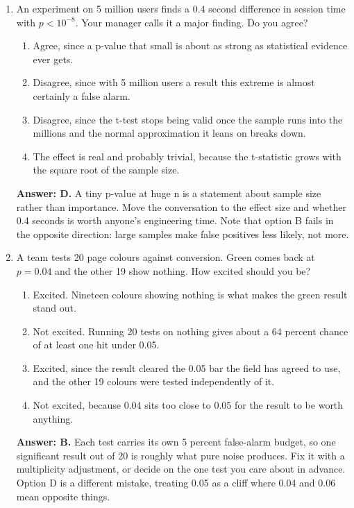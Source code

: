 \documentclass[11pt]{article}
\begin{document}
\begin{enumerate}[itemsep=14pt]
\item An experiment on 5 million users finds a 0.4 second difference in session time with $p < 10^{-8}$. Your manager calls it a major finding. Do you agree?

\begin{enumerate}[label=\Alph*., itemsep=1pt, topsep=3pt]
  \item Agree, since a p-value that small is about as strong as statistical evidence ever gets.
  \item Disagree, since with 5 million users a result this extreme is almost certainly a false alarm.
  \item Disagree, since the t-test stops being valid once the sample runs into the millions and the normal approximation it leans on breaks down.
  \item The effect is real and probably trivial, because the t-statistic grows with the square root of the sample size.
\end{enumerate}

\vspace{2pt}
\textbf{Answer: D.} A tiny p-value at huge n is a statement about sample size rather than importance. Move the conversation to the effect size and whether 0.4 seconds is worth anyone's engineering time. Note that option B fails in the opposite direction: large samples make false positives less likely, not more.
\vspace{4pt}

\item A team tests 20 page colours against conversion. Green comes back at $p = 0.04$ and the other 19 show nothing. How excited should you be?

\begin{enumerate}[label=\Alph*., itemsep=1pt, topsep=3pt]
  \item Excited. Nineteen colours showing nothing is what makes the green result stand out.
  \item Not excited. Running 20 tests on nothing gives about a 64 percent chance of at least one hit under 0.05.
  \item Excited, since the result cleared the 0.05 bar the field has agreed to use, and the other 19 colours were tested independently of it.
  \item Not excited, because 0.04 sits too close to 0.05 for the result to be worth anything.
\end{enumerate}

\vspace{2pt}
\textbf{Answer: B.} Each test carries its own 5 percent false-alarm budget, so one significant result out of 20 is roughly what pure noise produces. Fix it with a multiplicity adjustment, or decide on the one test you care about in advance. Option D is a different mistake, treating 0.05 as a cliff where 0.04 and 0.06 mean opposite things.
\vspace{4pt}


\end{enumerate}
\end{document}
